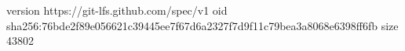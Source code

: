 version https://git-lfs.github.com/spec/v1
oid sha256:76bde2f89e056621c39445ee7f67d6a2327f7d9f11c79bea3a8068e6398ff6fb
size 43802

